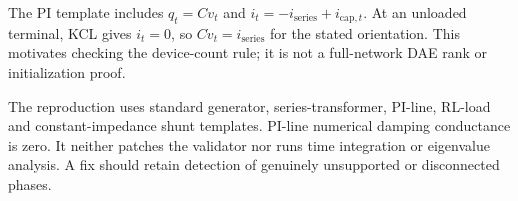 \documentclass[11pt,a4paper]{article}
\begin{document}
The PI template includes $q_t=Cv_t$ and
$i_t=-i_{\mathrm{series}}+i_{\mathrm{cap},t}$.
At an unloaded terminal, KCL gives $i_t=0$, so
$C\dot v_t=i_{\mathrm{series}}$ for the stated orientation.
This motivates checking the device-count rule; it is not a full-network
DAE rank or initialization proof.

The reproduction uses standard generator, series-transformer, PI-line,
RL-load and constant-impedance shunt templates. PI-line numerical damping
conductance is zero. It neither patches the validator nor runs time integration
or eigenvalue analysis. A fix should retain detection of genuinely unsupported
or disconnected phases.
\end{document}
